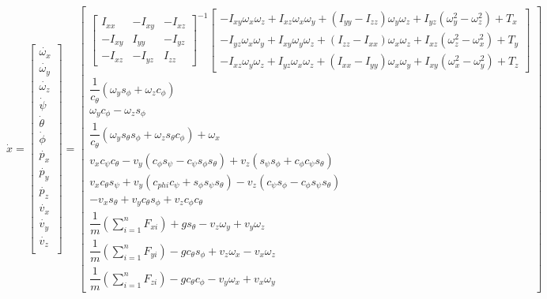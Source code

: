 \documentclass{article}
\begin{document}
\begin{equation}\label{eq:xdot}
\dot{x}=
\begin{bmatrix}
\dot{\omega_x} \\
\dot{\omega_y} \\
\dot{\omega_z} \\
\dot{\psi} \\
\dot{\theta} \\
\dot{\phi} \\
\dot{p_x} \\
\dot{p_y} \\
\dot{p_z} \\
\dot{v_x} \\
\dot{v_y} \\
\dot{v_z} \\
\end{bmatrix}=
\begin{bmatrix}
  \begin{bmatrix}
    I_{xx} & -I_{xy} & -I_{xz} \\
    -I_{xy} & I_{yy} & -I_{yz} \\
    -I_{xz} & -I_{yz} & I_{zz}
  \end{bmatrix}^{-1}  \begin{bmatrix}
  -I_{xy} \omega_x \omega_z + I_{xz} \omega_x \omega_y + (I_{yy} - I_{zz}) \omega_y \omega_z + I_{yz} (\omega_y^2 - \omega_z^2) + T_x \\
  -I_{yz} \omega_x \omega_y + I_{xy} \omega_y \omega_z + (I_{zz} - I_{xx}) \omega_x \omega_z + I_{xz} (\omega_z^2 - \omega_x^2) + T_y \\
  -I_{xz} \omega_y \omega_z + I_{yz} \omega_x \omega_z + (I_{xx} - I_{yy}) \omega_x \omega_y + I_{xy} (\omega_x^2 - \omega_y^2) + T_z
  \end{bmatrix} \\
\dfrac{1}{c_{\theta}}(\omega_y s_{\phi} + \omega_z c_{\phi}) \\
\omega_y c_{\phi} - \omega_z s_{\phi} \\
\dfrac{1}{c_{\theta}} (\omega_y s_{\theta} s_{\phi} + \omega_z s_{\theta} c_{\phi}) + \omega_x \\
v_x c_{\psi} c_{\theta} - v_y(c_{\phi}s_{\psi} - c_{\psi}s_{\phi}s_{\theta}) + v_z(s_{\psi}s_{\phi} + c_{\phi}c_{\psi}s_{\theta})\\
v_x c_{\theta} s_{\psi} + v_y(c_{phi}c_{\psi} + s_{\phi}s_{\psi}s_{\theta}) - v_z(c_{\psi}s_{\phi} - c_{\phi}s_{\psi}s_{\theta}) \\
-v_x s_{\theta} + v_y c_{\theta}s_{\phi} + v_z c_{\phi} c_{\theta} \\
\dfrac{1}{m} (\sum_{i=1}^{n} F_{xi}) + g s_{\theta} - v_z \omega_y + v_y \omega_z \\
\dfrac{1}{m} (\sum_{i=1}^{n} F_{yi}) - g c_{\theta} s_{\phi} + v_z \omega_x - v_x \omega_z \\
\dfrac{1}{m} (\sum_{i=1}^{n} F_{zi}) - g c_{\theta} c_{\phi} - v_y \omega_x + v_x \omega_y
  \end{bmatrix}
\end{equation}
\end{document}
